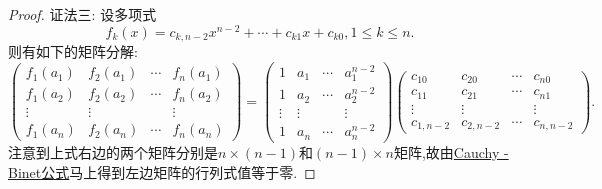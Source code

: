 \documentclass[../../main.tex]{subfiles}
\begin{document}
\begin{proof}
{\color{blue}证法三:}
设多项式
\[
f_k(x)=c_{k,n - 2}x^{n - 2}+\cdots+c_{k1}x + c_{k0},1\leqslant  k\leqslant  n.
\]
则有如下的矩阵分解:
\[
\begin{pmatrix}
f_1(a_1) & f_2(a_1) & \cdots & f_n(a_1)\\
f_1(a_2) & f_2(a_2) & \cdots & f_n(a_2)\\
\vdots & \vdots & & \vdots\\
f_1(a_n) & f_2(a_n) & \cdots & f_n(a_n)
\end{pmatrix}
=
\begin{pmatrix}
1 & a_1 & \cdots & a_1^{n - 2}\\
1 & a_2 & \cdots & a_2^{n - 2}\\
\vdots & \vdots & & \vdots\\
1 & a_n & \cdots & a_n^{n - 2}
\end{pmatrix}
\begin{pmatrix}
c_{10} & c_{20} & \cdots & c_{n0}\\
c_{11} & c_{21} & \cdots & c_{n1}\\
\vdots & \vdots & & \vdots\\
c_{1,n - 2} & c_{2,n - 2} & \cdots & c_{n,n - 2}
\end{pmatrix}.
\]
注意到上式右边的两个矩阵分别是\(n\times(n - 1)\)和\((n - 1)\times n\)矩阵,故由\hyperref[theorem:Cauchy-Binet公式]{Cauchy - Binet公式}马上得到左边矩阵的行列式值等于零.

\end{proof}
\end{document}
